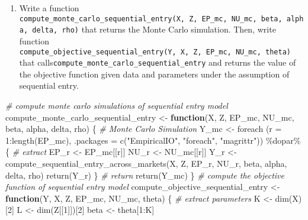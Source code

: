 \documentclass[
]{article}
\newenvironment{Shaded}{\begin{snugshade}}{\end{snugshade}}
\newcommand{\AttributeTok}[1]{\textcolor[rgb]{0.77,0.63,0.00}{#1}}
\newcommand{\CommentTok}[1]{\textcolor[rgb]{0.56,0.35,0.01}{\textit{#1}}}
\newcommand{\ControlFlowTok}[1]{\textcolor[rgb]{0.13,0.29,0.53}{\textbf{#1}}}
\newcommand{\DecValTok}[1]{\textcolor[rgb]{0.00,0.00,0.81}{#1}}
\newcommand{\FunctionTok}[1]{\textcolor[rgb]{0.00,0.00,0.00}{#1}}
\newcommand{\NormalTok}[1]{#1}
\newcommand{\OtherTok}[1]{\textcolor[rgb]{0.56,0.35,0.01}{#1}}
\newcommand{\SpecialCharTok}[1]{\textcolor[rgb]{0.00,0.00,0.00}{#1}}
\newcommand{\StringTok}[1]{\textcolor[rgb]{0.31,0.60,0.02}{#1}}
\providecommand{\tightlist}{%
  \setlength{\itemsep}{0pt}\setlength{\parskip}{0pt}}
\begin{document}
\begin{enumerate}
\def\labelenumi{\arabic{enumi}.}
\setcounter{enumi}{1}
\tightlist
\item
  Write a function
  \texttt{compute\_monte\_carlo\_sequential\_entry(X,\ Z,\ EP\_mc,\ NU\_mc,\ beta,\ alpha,\ delta,\ rho)}
  that returns the Monte Carlo simulation. Then, write function
  \texttt{compute\_objective\_sequential\_entry(Y,\ X,\ Z,\ EP\_mc,\ NU\_mc,\ theta)}
  that calls\texttt{compute\_monte\_carlo\_sequential\_entry} and
  returns the value of the objective function given data and parameters
  under the assumption of sequential entry.
\end{enumerate}

\begin{Shaded}
\begin{Highlighting}[]
\CommentTok{\# compute monte carlo simulations of sequential entry model}
\NormalTok{compute\_monte\_carlo\_sequential\_entry }\OtherTok{\textless{}{-}}
  \ControlFlowTok{function}\NormalTok{(X, Z, EP\_mc, NU\_mc,}
\NormalTok{           beta, alpha, delta, rho) \{}
    \CommentTok{\# Monte Carlo Simulation}
\NormalTok{    Y\_mc }\OtherTok{\textless{}{-}}
      \FunctionTok{foreach}\NormalTok{ (}\AttributeTok{r =} \DecValTok{1}\SpecialCharTok{:}\FunctionTok{length}\NormalTok{(EP\_mc), }\AttributeTok{.packages =} \FunctionTok{c}\NormalTok{(}\StringTok{"EmpiricalIO"}\NormalTok{, }\StringTok{"foreach"}\NormalTok{, }\StringTok{"magrittr"}\NormalTok{)) }\SpecialCharTok{\%dopar\%}\NormalTok{ \{}
        \CommentTok{\# extract}
\NormalTok{        EP\_r }\OtherTok{\textless{}{-}}\NormalTok{ EP\_mc[[r]]}
\NormalTok{        NU\_r }\OtherTok{\textless{}{-}}\NormalTok{ NU\_mc[[r]]}
\NormalTok{        Y\_r }\OtherTok{\textless{}{-}}
          \FunctionTok{compute\_sequential\_entry\_across\_markets}\NormalTok{(X, Z, EP\_r, NU\_r, beta, alpha, delta, rho)}
        \FunctionTok{return}\NormalTok{(Y\_r)}
\NormalTok{      \}}
    \CommentTok{\# return}
    \FunctionTok{return}\NormalTok{(Y\_mc)}
\NormalTok{  \}}
\CommentTok{\# compute the objective function of sequential entry model}
\NormalTok{compute\_objective\_sequential\_entry }\OtherTok{\textless{}{-}}
  \ControlFlowTok{function}\NormalTok{(Y, X, Z, EP\_mc, NU\_mc, theta) \{}
    \CommentTok{\# extract parameters}
\NormalTok{    K }\OtherTok{\textless{}{-}} \FunctionTok{dim}\NormalTok{(X)[}\DecValTok{2}\NormalTok{]}
\NormalTok{    L }\OtherTok{\textless{}{-}} \FunctionTok{dim}\NormalTok{(Z[[}\DecValTok{1}\NormalTok{]])[}\DecValTok{2}\NormalTok{]}
\NormalTok{    beta }\OtherTok{\textless{}{-}}\NormalTok{ theta[}\DecValTok{1}\SpecialCharTok{:}\NormalTok{K]}

\end{Highlighting}
\end{Shaded}
\end{document}

